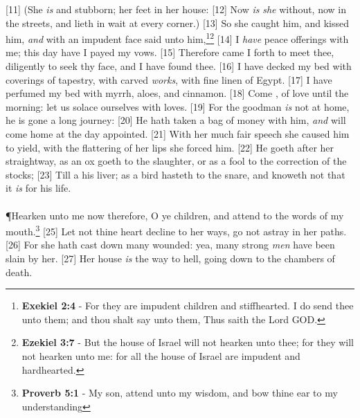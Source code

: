 [11] \textcolor[cmyk]{0.99998,1,0,0}{(She  \emph{is}  and stubborn; her feet  in her house:}
[12] \textcolor[cmyk]{0.99998,1,0,0}{Now  \emph{is} \emph{she} without, now in the streets, and lieth in wait at every corner.)}
[13] \textcolor[cmyk]{0.99998,1,0,0}{So  she caught him, and kissed him, \emph{and} with an impudent face said unto him,}\footnote{\textbf{Exekiel 2:4} - For they are impudent children and stiffhearted. I do send thee unto them; and thou shalt say unto them, Thus saith the Lord GOD.}\footnote{\textbf{Ezekiel 3:7} - But the house of Israel will not hearken unto thee; for they will not hearken unto me: for all the house of Israel are impudent and hardhearted.}
[14] \textcolor[cmyk]{0.99998,1,0,0}{I \emph{have} peace offerings with me; this day have I payed my vows.}
[15] \textcolor[cmyk]{0.99998,1,0,0}{Therefore  came I forth to meet thee, diligently to seek thy face, and I have found thee.}
[16] \textcolor[cmyk]{0.99998,1,0,0}{I  have decked my bed with coverings of tapestry, with carved \emph{works}, with fine linen of Egypt.}
[17] \textcolor[cmyk]{0.99998,1,0,0}{I  have perfumed my bed with myrrh, aloes, and cinnamon.}
[18] \textcolor[cmyk]{0.99998,1,0,0}{Come ,  of love until the morning: let us solace ourselves with loves.}
[19] \textcolor[cmyk]{0.99998,1,0,0}{For  the goodman \emph{is} not at home, he is gone a long journey:}
[20] \textcolor[cmyk]{0.99998,1,0,0}{He  hath taken a bag of money with him, \emph{and} will come home at the day appointed.}
[21] \textcolor[cmyk]{0.99998,1,0,0}{With  her much fair speech she caused him to yield, with the flattering of her lips she forced him.}
[22] \textcolor[cmyk]{0.99998,1,0,0}{He goeth after her straightway, as an ox goeth to the slaughter, or as a fool to the correction of the stocks;}
[23] \textcolor[cmyk]{0.99998,1,0,0}{Till a  his liver; as a bird hasteth to the snare, and knoweth not that it \emph{is} for his life.}\\
\\
\P \textcolor[cmyk]{0.99998,1,0,0}{Hearken unto me now therefore, O ye children, and attend to the words of my mouth.}\footnote{\textbf{Proverb 5:1} - My son, attend unto my wisdom, and bow thine ear to my understanding}
[25] \textcolor[cmyk]{0.99998,1,0,0}{Let not thine heart decline to her ways, go not astray in her paths.}
[26] \textcolor[cmyk]{0.99998,1,0,0}{For she hath cast down many wounded: yea, many strong \emph{men} have been slain by her.}
[27] \textcolor[cmyk]{0.99998,1,0,0}{Her house \emph{is} the way to hell, going down to the chambers of death.}




